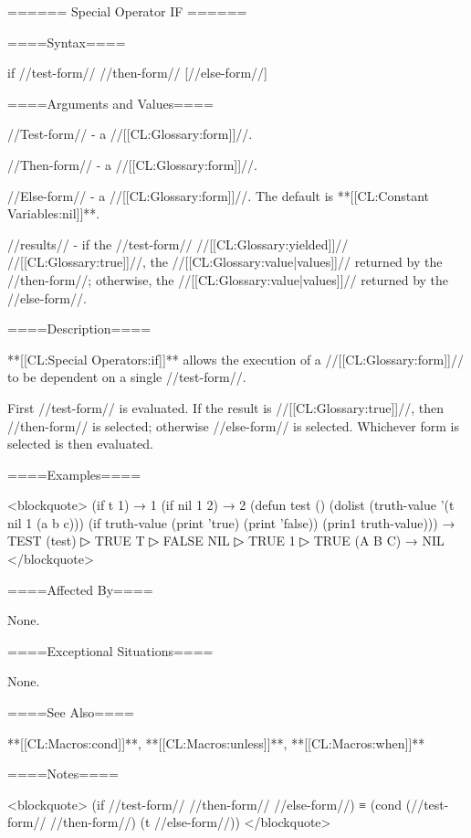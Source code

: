 ====== Special Operator IF ======

====Syntax====

\DefspecWithValues if {//test-form// //then-form// [//else-form//]} {}

====Arguments and Values====

//Test-form// - a //[[CL:Glossary:form]]//.

//Then-form// - a //[[CL:Glossary:form]]//.

//Else-form// - a //[[CL:Glossary:form]]//. The default is **[[CL:Constant Variables:nil]]**.

//results// - if the //test-form// //[[CL:Glossary:yielded]]// //[[CL:Glossary:true]]//, the //[[CL:Glossary:value|values]]// returned by the //then-form//; otherwise, the //[[CL:Glossary:value|values]]// returned by the //else-form//.

====Description====

**[[CL:Special Operators:if]]** allows the execution of a //[[CL:Glossary:form]]// to be dependent on a single //test-form//.

First //test-form// is evaluated. If the result is //[[CL:Glossary:true]]//, then //then-form// is selected; otherwise //else-form// is selected. Whichever form is selected is then evaluated.

====Examples====

<blockquote> (if t 1) → 1 (if nil 1 2) → 2 (defun test () (dolist (truth-value '(t nil 1 (a b c))) (if truth-value (print 'true) (print 'false)) (prin1 truth-value))) → TEST (test)
▷ TRUE T
▷ FALSE NIL
▷ TRUE 1
▷ TRUE (A B C) → NIL </blockquote>

====Affected By====

None.

====Exceptional Situations====

None.

====See Also====

**[[CL:Macros:cond]]**, **[[CL:Macros:unless]]**, **[[CL:Macros:when]]**

====Notes====

<blockquote> (if //test-form// //then-form// //else-form//) ≡ (cond (//test-form// //then-form//) (t //else-form//)) </blockquote>

